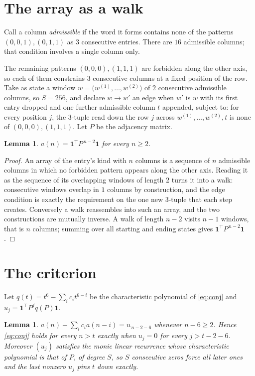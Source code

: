 \documentclass[11pt,a4paper]{article}
\theoremstyle{plain}
\newtheorem{lemma}[theorem]{Lemma}
\theoremstyle{definition}
\begin{document}
\section{The array as a walk}

Call a column \emph{admissible} if the word it forms contains none of the patterns
$(0,0,1), (0,1,1)$ as $3$ consecutive entries. There are $16$ admissible columns; that condition
involves a single column only.

The remaining patterns $(0,0,0), (1,1,1)$ are forbidden along the other axis, so each of them
constrains $3$ consecutive columns at a fixed position of the row. Take as state a
window $w=\bigl(w^{(1)},\dots,w^{(2)}\bigr)$ of $2$ consecutive admissible
columns, so $S=256$, and declare $w\to w'$ an edge when $w'$ is $w$ with its first entry
dropped and one further admissible column $t$ appended, subject to: for every position
$j$, the $3$-tuple read down the row $j$ across $w^{(1)},\dots,w^{(2)},t$
is none of $(0,0,0), (1,1,1)$. Let $P$ be the adjacency matrix.

\begin{lemma}\label{lem:walk}
$a(n)=\mathbf{1}^{\!\top}P^{\,n-2}\mathbf{1}$ for every $n\ge2$.
\end{lemma}

\begin{proof}
An array of the entry's kind with $n$ columns is a sequence of $n$ admissible columns in
which no forbidden pattern appears along the other axis. Reading it as the sequence of its
overlapping windows of length $2$ turns it into a walk: consecutive windows overlap in
$1$ columns by construction, and the edge condition is exactly the requirement on the one
new $3$-tuple that each step creates. Conversely a walk reassembles into such an array,
and the two constructions are mutually inverse. A walk of length $n-2$ visits $n-1$
windows, that is $n$ columns; summing over all starting and ending states gives
$\mathbf{1}^{\!\top}P^{\,n-2}\mathbf{1}$.
\end{proof}

\section{The criterion}

Let $q(t)=t^{6}-\sum_i c_i t^{6-i}$ be the characteristic polynomial of
\eqref{eq:conj} and $u_j=\mathbf{1}^{\!\top}P^{j}q(P)\mathbf{1}$.

\begin{lemma}\label{lem:crit}
$a(n)-\sum_i c_i a(n-i)=u_{\,n-2-6}$ whenever $n-6\ge2$. Hence
\eqref{eq:conj} holds for every $n>t$ exactly when $u_j=0$ for every
$j>t-2-6$. Moreover $(u_j)$ satisfies the monic linear recurrence whose
characteristic polynomial is that of $P$, of degree $S$, so $S$ consecutive zeros force all
later ones and the last nonzero $u_j$ pins $t$ down exactly.
\end{lemma}
\end{document}
